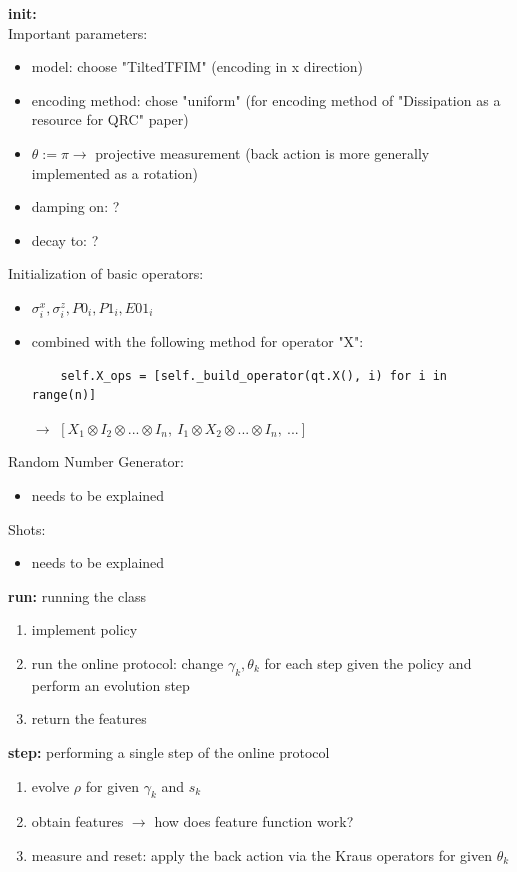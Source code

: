 \textbf{init:}\\
Important parameters:
\begin{itemize}
    \item model: choose "TiltedTFIM" (encoding in x direction)
    \item encoding method: chose "uniform" (for encoding method of "Dissipation as a resource for QRC" paper)
    \item $\theta := \pi \to$ projective measurement (back action is more generally implemented as a rotation)
    \item damping on: ?
    \item decay to: ?
\end{itemize}

Initialization of basic operators:
\begin{itemize}
    \item $\sigma_i^x, \sigma_i^z, P0_i, P1_i, E01_i $
    \item combined with the following method for operator "X": \\
    \begin{lstlisting}
    self.X_ops = [self._build_operator(qt.X(), i) for i in range(n)]
    \end{lstlisting}
    $\to$ $[X_1 \otimes I_2 \otimes ... \otimes I_n, \ I_1 \otimes X_2 \otimes ... \otimes I_n, \ ... ]$
\end{itemize}

Random Number Generator:
\begin{itemize}
    \item needs to be explained
\end{itemize}

Shots:
\begin{itemize}
    \item needs to be explained
\end{itemize}

\textbf{run:}
running the class
\begin{enumerate}
    \item implement policy
    \item run the online protocol: change $\gamma_k, \theta_k$ for each step given the policy and perform an evolution step
    \item return the features
\end{enumerate}

\textbf{step:}
performing a single step of the online protocol
\begin{enumerate}
    \item evolve $\rho$ for given $\gamma_k$ and $s_k$
    \item obtain features $\to$ how does feature function work?
    \item measure and reset: apply the back action via the Kraus operators for given $\theta_k$
\end{enumerate}

